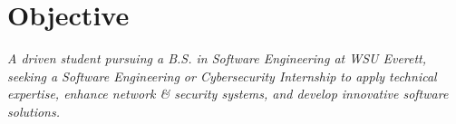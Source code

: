 \section{Objective}
\textit{A driven student pursuing a B.S. in Software Engineering at WSU Everett, seeking a Software Engineering or Cybersecurity Internship to apply technical expertise, enhance network \& security systems, and develop innovative software solutions. \\}
